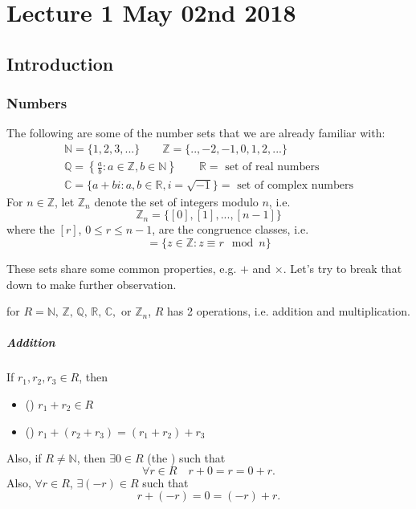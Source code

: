 \chapter{Lecture 1 May 02nd 2018}
  \label{chapter:lecture_1_may_02nd_2018}

\section{Introduction} %
\label{sec:introduction}

\subsection{Numbers} %
\label{sub:numbers}

The following are some of the number sets that we are already familiar with:
\begin{gather*}
  \mathbb{N} = \{1, 2, 3, ...\} \qquad \mathbb{Z} = \{.., -2, -1, 0, 1, 2, ...\} \\
  \mathbb{Q} = \left\{\frac{a}{b} : a \in \mathbb{Z}, b \in \mathbb{N} \right\} \qquad \mathbb{R} = \text{ set of real numbers} \\
  \mathbb{C} = \{a + bi : a, b \in \mathbb{R}, i = \sqrt{-1} \} = \text{ set of complex numbers} 
\end{gather*}
For $n \in \mathbb{Z}$, let $\mathbb{Z}_n$ denote the set of integers modulo $n$, i.e.
\begin{equation*}
  \mathbb{Z}_n = \{ [0], [1], ..., [n - 1] \}
\end{equation*}
where the $[r]$, $0 \leq r \leq n - 1$, are the congruence classes, i.e.
\begin{equation*}
  [r] = \{z \in \mathbb{Z} : z \equiv r \mod n\}
\end{equation*}

These sets share some common properties, e.g. $+$ and $\times$. Let's try to break that down to make further observation.

 for $R = \mathbb{N}, \, \mathbb{Z}, \, \mathbb{Q}, \, \mathbb{R}, \, \mathbb{C},$ or $\mathbb{Z}_n$, $R$ has 2 operations, i.e. addition and multiplication.

\paragraph{Addition} If $r_1, r_2, r_3 \in R$, then
\begin{itemize}
  \item () $r_1 + r_2 \in R$
  \item () $r_1 + (r_2 + r_3) = (r_1 + r_2) + r_3$
\end{itemize}
Also, if $R \neq \mathbb{N}$, then $\exists 0 \in R$ (the ) such that
\begin{equation*}
  \forall r \in R \quad r + 0 = r = 0 + r.
\end{equation*}
Also, $\forall r \in R$, $\exists (-r) \in R$ such that
\begin{equation*}
  r + (-r) = 0 = (-r) + r.
\end{equation*}

